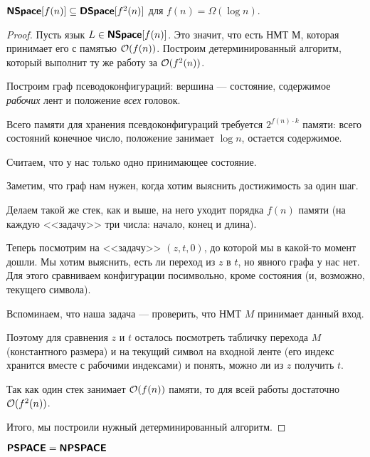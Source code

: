 \begin{thm}
	$ \textmd{\textbf{\textsf{NSpace}}}[f(n)] \subseteq \textmd{\textbf{\textsf{DSpace}}}[f^2(n)]$ для $ f(n) = \Omega (\log n)$.
\end{thm}
\begin{proof}
    Пусть язык $L \in \textmd{\textbf{\textsf{NSpace}}}[f(n)]$. Это значит, что есть НМТ $М$, которая принимает его с памятью $\mathcal{O}(f(n))$. Построим детерминированный алгоритм, который выполнит ту же работу за $\mathcal{O}(f^2(n))$.
    
	Построим граф псеводоконфигураций: вершина --- состояние, содержимое \textit{рабочих} лент и положение \textit{всех} головок.

	Всего памяти для хранения псевдоконфигураций требуется  $ 2^{f(n)\cdot k}$ памяти: всего состояний конечное число, положение занимает $ \log n$, остается содержимое.

	Считаем, что у нас только одно принимающее состояние. 

	Заметим, что граф нам нужен, когда хотим выяснить достижимость за один шаг.

	Делаем такой же стек, как и выше, на него уходит порядка $ f(n)$ памяти (на каждую <<задачу>> три числа: начало, конец и длина).

	Теперь посмотрим на <<задачу>> $ (z, t, 0)$, до которой мы в какой-то момент дошли. Мы хотим выяснить, есть ли переход из $ z$ в $ t$, но явного графа у нас нет. Для этого сравниваем конфигурации посимвольно, кроме состояния (и, возможно, текущего символа). 

	Вспоминаем, что наша задача --- проверить, что НМТ $ M$ принимает данный вход. 
	
	Поэтому для сравнения $ z$ и $ t$ осталось посмотреть табличку перехода $ M$ (константного размера) и на текущий символ на входной ленте (его индекс хранится вместе с рабочими индексами) и понять, можно ли из $ z$ получить $ t$.  

	Так как один стек занимает $ \mathcal{O}(f(n))$ памяти, то для всей работы достаточно $ \mathcal{O}(f^2(n))$.
	
	Итого, мы построили нужный детерминированный алгоритм.
\end{proof}
\begin{cor}
    $ \textmd{\textbf{\textsf{PSPACE}}} = \textmd{\textbf{\textsf{NPSPACE}}}$
\end{cor}

